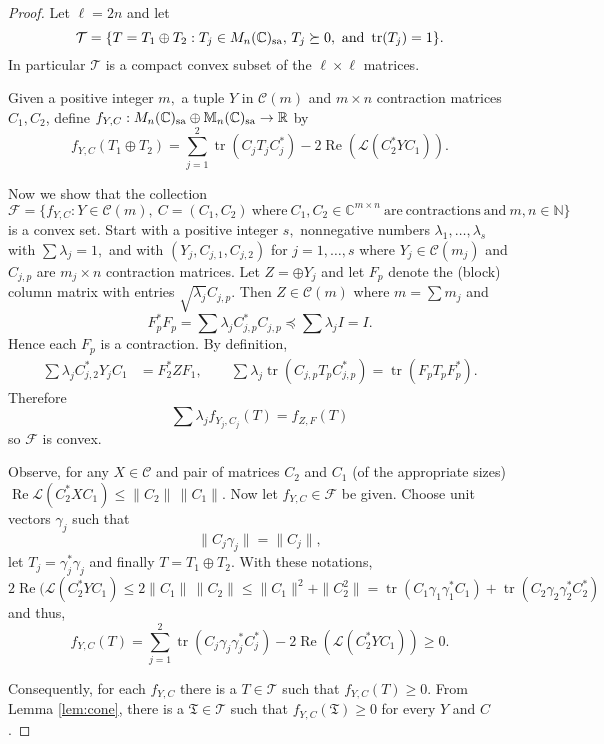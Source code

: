 \documentclass[12pt,makeidx]{amsart}
\DeclareMathOperator{\tr}{tr}
\numberwithin{equation}{section}
\def\bbF{ {\mathbb C}}
\def\cC{ {\mathcal C} }
\def\cL{ {\mathcal L} }
\def\cT{{\mathcal T}}
\def\Cr{C_1}
\def\Cl{C_2}
\def\hh{T}
\def\hhs{\mathfrak{T}}
\begin{document}
\begin{proof}
   Let $\ell=2n$ and let 
\[
  \cT =\{T= T_1\oplus T_2 : T_j \in M_n(\bbF)_{\rm sa}, \, T_j\succeq 0, \mbox{ and } \tr(T_j)= 1\}.
\]
 In particular $\cT$ is a compact convex subset of the $\ell\times\ell$ matrices. 
 
 Given a positive integer $m,$ a  tuple $Y$ in $\cC(m)$
 and  $m\times n$ contraction 
matrices $\Cr,\Cl$, define
 $f_{Y,C}:M_n(\bbF)_{\rm sa} \oplus \mathbb M_n(\bbF)_{\rm sa} \to \mathbb R$ by 
\[
  f_{Y,C}(T_1\oplus T_2)=\sum_{j=1}^2 \tr(C_j T_j C_j^{\ast})  - 2 \operatorname{Re}(\mathcal L (\Cl^{\ast}Y\Cr)).
\]

  Now we show that the collection
  \[
  \mathcal F=\{f_{Y,C}:Y \in \cC(m),  \ C=(C_1,C_2) \ \mathrm{where} \ C_1,C_2 \in \bbF^{m \times n} \ \mathrm{are \ contractions\ and \ }  m,n \in \mathbb{N} \}
  \]
 is
  a convex set. Start with a positive integer $s,$ 
  nonnegative numbers $\lambda_1,\dots,\lambda_s$ with
  $\sum \lambda_j=1,$ and with $(Y_j,C_{j,1},C_{j,2})$ 
  for $j=1,\dots,s$ where $Y_j\in\cC(m_j)$ and $C_{j,p}$ are $m_j\times n$
  contraction matrices. Let $Z=\oplus Y_j$
  and let $F_p$ denote the (block) column matrix with entries
  $\sqrt{\lambda_j} C_{j,p}$. Then $Z\in \cC(m)$ where $m=\sum m_j$ and
\[
  F_p^*F_p =\sum \lambda_j C_{j,p}^*C_{j,p} \preceq \sum \lambda_j I =I.
\]
 Hence each $F_p$ is a contraction.
 By definition,
\[
\begin{split}
 \sum \lambda_j C_{j,2}^* Y_j C_1 & = F_2^* ZF_1,\qquad
 \sum \lambda_j \tr(C_{j,p} T_p C_{j,p}^*) = \tr(F_p T_pF_p^*).
 \end{split}
\]
 Therefore
\[
  \sum \lambda_j f_{Y_j,C_j}(\hh) = f_{Z,F}(\hh)
\]
so $\mathcal{F}$ is convex.

 Observe, for any $X\in \cC$ and  pair of matrices $\Cl$ and $\Cr$  (of the appropriate sizes) $\operatorname{Re} \cL(\Cl^* X \Cr) \le \|\Cl\|\,\|\Cr\|$. Now  let $f_{Y,C} \in\mathcal F$ be given.  Choose unit vectors $\gamma_j$ such that
\[
 \|C_j \gamma_j \| =\|C_j\|,
\]
  let $T_j=\gamma_j^* \gamma_j$ and finally $T=T_1\oplus T_2$. With these  notations,
\[
2 \operatorname{Re}(\cL( \Cl^{\ast} Y \Cr) \le 2\|C_1\|\, \|C_2\| \le \|C_1\|^2 +\|C_2^2\| =\tr(C_1\gamma_1\gamma_1^* C_1) + \tr(C_2\gamma_2 \gamma_2^* C_2^*)
\]
and thus,
\[
 f_{Y,C}(T) = \sum_{j=1}^2\tr(C_j \gamma_j\gamma_j^* C_j^*) - 2 \operatorname{Re}(\mathcal L (\Cl^{\ast} Y \Cr)) \ge 0.
\]


 Consequently, for each $f_{Y,C}$ there is a $T\in\cT$ such
 that $f_{Y,C}(T)\ge 0$. From 
 Lemma \ref{lem:cone}, there is a $\hhs \in \cT$ such that
 $f_{Y,C}(\hhs)\ge 0$ for every $Y$ and $C$. 
\end{proof}
\end{document}
